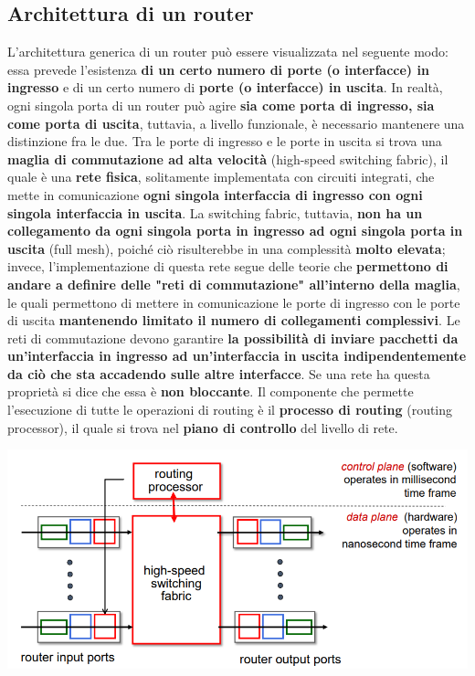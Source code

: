 \documentclass[12pt]{article}
\begin{document}
\subsection{Architettura di un router}
L'architettura generica di un router può essere visualizzata nel seguente modo:
essa prevede l'esistenza \textbf{di un certo numero di porte (o interfacce) in ingresso} e di un certo numero di \textbf{porte (o interfacce) in uscita}.
In realtà, ogni singola porta di un router può agire \textbf{sia come porta di ingresso, sia come porta di uscita}, tuttavia, a livello funzionale, è necessario
mantenere una distinzione fra le due. Tra le porte di ingresso e le porte in uscita si trova una \textbf{maglia di commutazione ad alta velocità} (high-speed switching fabric), il quale è una
\textbf{rete fisica}, solitamente implementata con circuiti integrati, che mette in comunicazione \textbf{ogni singola interfaccia di ingresso con ogni singola interfaccia in uscita}.
La switching fabric, tuttavia, \textbf{non ha un collegamento da ogni singola porta in ingresso ad ogni singola porta in uscita} (full mesh), poiché ciò risulterebbe in una complessità \textbf{molto elevata};
invece, l'implementazione di questa rete segue delle teorie che \textbf{permettono di andare a definire delle "reti di commutazione" all'interno della maglia}, le quali permettono di mettere in comunicazione le porte di ingresso con le porte di uscita
\textbf{mantenendo limitato il numero di collegamenti complessivi}.
Le reti di commutazione devono garantire \textbf{la possibilità di inviare pacchetti da un'interfaccia in ingresso ad un'interfaccia in uscita indipendentemente da ciò che sta accadendo sulle altre interfacce}.
Se una rete ha questa proprietà si dice che essa è \textbf{non bloccante}.
Il componente che permette l'esecuzione di tutte le operazioni di routing è il \textbf{processo di routing} (routing processor), il quale si trova nel \textbf{piano di controllo} del livello di rete.
\begin{center}
    \includegraphics[width = 0.80\linewidth]{Images/77.png}
\end{center}
\end{document}
